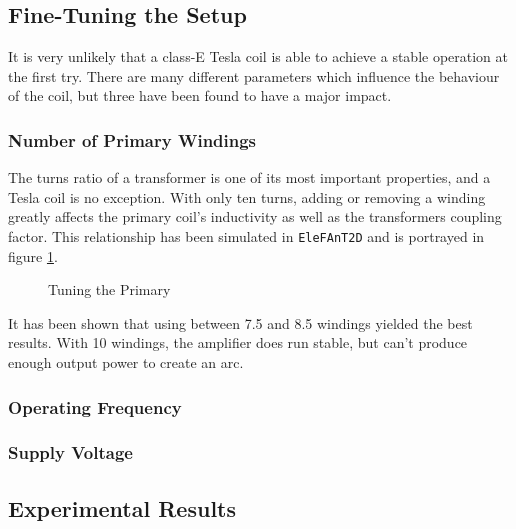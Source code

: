 \subsection{Fine-Tuning the Setup} %

It is very unlikely that a class-E Tesla coil is able to achieve a stable operation at the first try. There are many different parameters which influence the behaviour of the coil, but three have been found to have a major impact.

\subsubsection{Number of Primary Windings}

The turns ratio of a transformer is one of its most important properties, and a Tesla coil is no exception. With only ten turns, adding or removing a winding greatly affects the primary coil's inductivity as well as the transformers coupling factor. This relationship has been simulated in \texttt{EleFAnT2D} and is portrayed in figure \ref{fig:tuning-the-primary}.

\begin{figure}
    \centering
    \caption{Tuning the Primary}
    \label{fig:tuning-the-primary}
\end{figure}

It has been shown that using between 7.5 and 8.5 windings yielded the best results. With 10 windings, the amplifier does run stable, but can't produce enough output power to create an arc.

\subsubsection{Operating Frequency}

\subsubsection{Supply Voltage}

\subsection{Experimental Results}